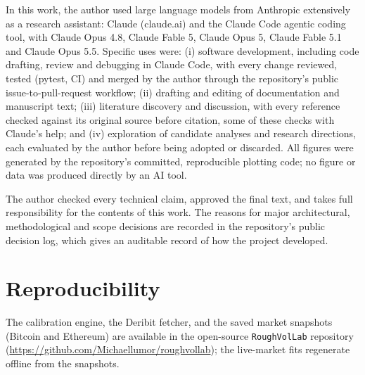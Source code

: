 \documentclass[11pt,a4paper]{article}
\numberwithin{equation}{section}
\begin{document}
In this work, the author used large language models from Anthropic extensively as a research
assistant: Claude (claude.ai) and the Claude Code agentic coding tool, with Claude Opus 4.8,
Claude Fable 5, Claude Opus 5, Claude Fable 5.1 and Claude Opus 5.5. Specific uses were:
(i) software development, including code drafting, review and debugging in Claude Code, with
every change reviewed, tested (pytest, CI) and merged by the author through the repository's
public issue-to-pull-request workflow; (ii) drafting and editing of documentation and
manuscript text; (iii) literature discovery and discussion, with every reference checked
against its original source before citation, some of these checks with Claude's help; and
(iv) exploration of candidate analyses and research directions, each evaluated by the author
before being adopted or discarded. All figures were generated by the repository's committed,
reproducible plotting code; no figure or data was produced directly by an AI tool.

The author checked every technical claim, approved the final text, and takes full
responsibility for the contents of this work. The reasons for major architectural,
methodological and scope decisions are recorded in the repository's public decision log,
which gives an auditable record of how the project developed.

\section*{Reproducibility}
The calibration engine, the Deribit fetcher, and the saved market snapshots (Bitcoin and
Ethereum) are available in the open-source \texttt{RoughVolLab} repository
(\url{https://github.com/Michaellumor/roughvollab}); the live-market fits regenerate offline
from the snapshots.
\end{document}
